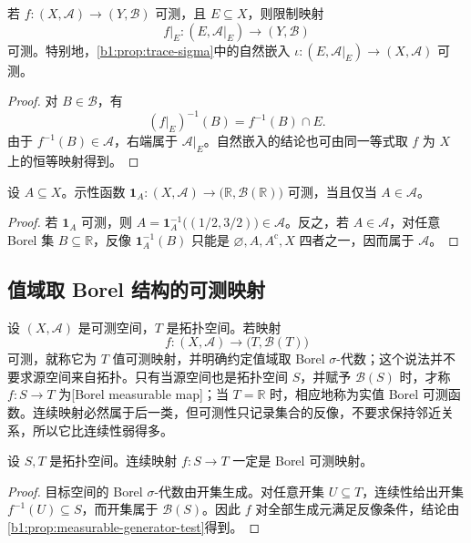 \begin{proposition}
\label{b1:prop:measurable-restriction}
若 \(f:(X,\mathcal A)\to(Y,\mathcal B)\) 可测，且 \(E\subseteq X\)，则限制映射
\[
f|_E:(E,\mathcal A|_E)\longrightarrow(Y,\mathcal B)
\]
可测。特别地，\cref{b1:prop:trace-sigma}中的自然嵌入
\(
\iota:(E,\mathcal A|_E)\to(X,\mathcal A)
\)
可测。
\end{proposition}
\begin{proof}
对 \(B\in\mathcal B\)，有
\[
(f|_E)^{-1}(B)
=f^{-1}(B)\cap E.
\]
由于 \(f^{-1}(B)\in\mathcal A\)，右端属于 \(\mathcal A|_E\)。自然嵌入的结论也可由同一等式取 \(f\) 为 \(X\) 上的恒等映射得到。
\end{proof}

\begin{proposition}
\label{b1:prop:indicator-measurable}
设 \(A\subseteq X\)。示性函数
\(
\mathbf 1_A:(X,\mathcal A)\to\bigl(\mathbb R,\mathcal B(\mathbb R)\bigr)
\)
可测，当且仅当 \(A\in\mathcal A\)。
\end{proposition}
\begin{proof}
若 \(\mathbf 1_A\) 可测，则
\(
A=\mathbf 1_A^{-1}\bigl((1/2,3/2)\bigr)\in\mathcal A
\)。反之，若 \(A\in\mathcal A\)，对任意 Borel 集 \(B\subseteq\mathbb R\)，反像 \(\mathbf 1_A^{-1}(B)\) 只能是 \(\varnothing,A,A^{\mathrm c},X\) 四者之一，因而属于 \(\mathcal A\)。
\end{proof}

\subsection{值域取 Borel 结构的可测映射}
\label{b1:subsec:010403}

设 \((X,\mathcal A)\) 是可测空间，\(T\) 是拓扑空间。若映射
\[
f:(X,\mathcal A)\longrightarrow\bigl(T,\mathcal B(T)\bigr)
\]
可测，就称它为 \(T\) 值可测映射，并明确约定值域取 Borel \(\sigma\)-代数；这个说法并不要求源空间来自拓扑。只有当源空间也是拓扑空间 \(S\)，并赋予 \(\mathcal B(S)\) 时，才称 \(f:S\to T\) 为[Borel measurable map]；当 \(T=\mathbb R\) 时，相应地称为实值 Borel 可测函数。连续映射必然属于后一类，但可测性只记录集合的反像，不要求保持邻近关系，所以它比连续性弱得多。

\begin{proposition}
\label{b1:prop:continuous-borel}
设 \(S,T\) 是拓扑空间。连续映射 \(f:S\to T\) 一定是 Borel 可测映射。
\end{proposition}
\begin{proof}
目标空间的 Borel \(\sigma\)-代数由开集生成。对任意开集 \(U\subseteq T\)，连续性给出开集 \(f^{-1}(U)\subseteq S\)，而开集属于 \(\mathcal B(S)\)。因此 \(f\) 对全部生成元满足反像条件，结论由\cref{b1:prop:measurable-generator-test}得到。
\end{proof}

